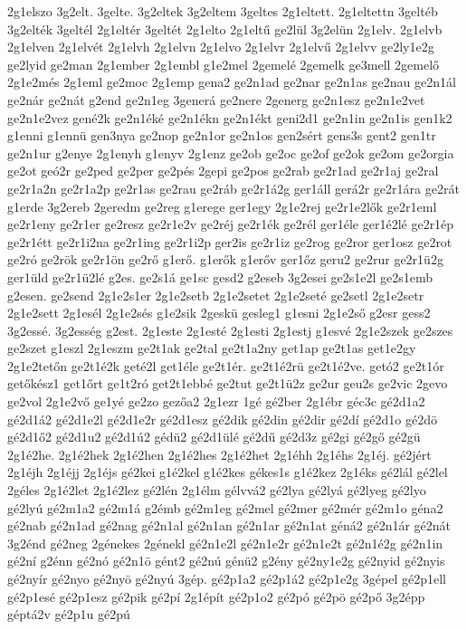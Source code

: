 {2g1elszo
3g2elt.
3gelte.
3g2eltek
3g2eltem
3geltes
2g1eltett.
2g1eltettn
3geltéb
3g2elték
3geltél
2g1eltér
3geltét
2g1elto
2g1eltű
ge2lül
3g2elün
2g1elv.
2g1elvb
2g1elven
2g1elvét
2g1elvh
2g1elvn
2g1elvo
2g1elvr
2g1elvű
2g1elvv
ge2ly1e2g
ge2lyid
ge2man
2g1ember
2g1embl
g1e2mel
2gemelé
2gemelk
ge3mell
2gemelő
2g1e2més
2g1eml
ge2moc
2g1emp
gena2
ge2n1ad
ge2nar
ge2n1as
ge2nau
ge2n1ál
ge2nár
ge2nát
g2end
ge2n1eg
3generá
ge2nere
2generg
ge2n1esz
ge2n1e2vet
ge2n1e2vez
gené2k
ge2n1éké
ge2n1ékn
ge2n1ékt
geni2d1
ge2n1in
ge2n1is
gen1k2
g1enni
g1ennü
gen3nya
ge2nop
ge2n1or
ge2n1os
gen2sért
gens3s
gent2
gen1tr
ge2n1ur
g2enye
2g1enyh
g1enyv
2g1enz
ge2ob
ge2oc
ge2of
ge2ok
ge2om
ge2orgia
ge2ot
geó2r
ge2ped
ge2per
ge2pés
2gepi
ge2pos
ge2rab
ge2r1ad
ge2r1aj
ge2ral
ge2r1a2n
ge2r1a2p
ge2r1as
ge2rau
ge2ráb
ge2r1á2g
ger1áll
gerá2r
ge2r1ára
ge2rát
g1erde
3g2ereb
2geredm
ge2reg
g1erege
ger1egy
2g1e2rej
ge2r1e2lők
ge2r1eml
ge2r1eny
ge2r1er
ge2resz
ge2r1e2v
ge2réj
ge2r1ék
ge2rél
ger1éle
ger1é2lé
ge2r1ép
ge2r1étt
ge2r1i2na
ge2r1ing
ge2r1i2p
ger2is
ge2r1iz
ge2rog
ge2ror
ger1osz
ge2rot
ge2ró
ge2rök
ge2r1ön
ge2rő
g1erő.
g1erők
g1erőv
ger1őz
geru2
ge2rur
ge2r1ü2g
ger1üld
ge2r1ü2lé
g2es.
ge2s1á
ge1sc
gesd2
g2eseb
3g2esei
ge2s1e2l
ge2s1emb
g2esen.
ge2send
2g1e2s1er
2g1e2setb
2g1e2setet
2g1e2seté
ge2setl
2g1e2setr
2g1e2sett
2g1esél
2g1e2sés
g1e2sik
2geskü
gesleg1
g1esni
2g1e2ső
g2esr
gess2
3g2essé.
3g2esség
g2est.
2g1este
2g1esté
2g1esti
2g1estj
g1esvé
2g1e2szek
ge2szes
ge2szet
g1eszl
2g1eszm
ge2t1ak
ge2tal
ge2t1a2ny
get1ap
ge2t1as
get1e2gy
2g1e2tetőn
ge2t1é2k
geté2l
get1éle
ge2t1ér.
ge2t1é2rü
ge2t1é2ve.
getó2
ge2t1ór
getőkész1
get1őrt
ge1t2ró
get2t1ebbé
ge2tut
ge2t1ü2z
ge2ur
geu2s
ge2vic
2gevo
ge2vol
2g1e2vő
ge1yé
ge2zo
gezőa2
2g1ezr
1gé
gé2ber
2g1ébr
géc3c
gé2d1a2
gé2d1á2
gé2d1e2l
gé2d1e2r
gé2d1esz
gé2dik
gé2din
gé2dir
gé2dí
gé2d1o
gé2dö
gé2d1ő2
gé2d1u2
gé2d1ú2
gédü2
gé2d1ülé
gé2dű
gé2d3z
gé2gi
gé2gő
gé2gü
2g1é2he.
2g1é2hek
2g1é2hen
2g1é2hes
2g1é2het
2g1éhh
2g1éhs
2g1éj.
gé2jért
2g1éjh
2g1éjj
2g1éjs
gé2kei
g1é2kel
g1é2kes
gékes1s
g1é2kez
2g1éks
gé2lál
gé2lel
2géles
2g1é2let
2g1é2lez
gé2lén
2g1élm
gélvvá2
gé2lya
gé2lyá
gé2lyeg
gé2lyo
gé2lyú
gé2m1a2
gé2m1á
g2émb
gé2m1eg
gé2mel
gé2mer
gé2mér
gé2m1o
géna2
gé2nab
gé2n1ad
gé2nag
gé2n1al
gé2n1an
gé2n1ar
gé2n1at
géná2
gé2n1ár
gé2nát
3g2énd
gé2neg
2génekes
2génekl
gé2n1e2l
gé2n1e2r
gé2n1e2t
gé2n1é2g
gé2n1in
gé2ní
g2énn
gé2nó
gé2n1ö
gént2
gé2nú
génü2
g2ény
gé2ny1e2g
gé2nyid
gé2nyis
gé2nyír
gé2nyo
gé2nyö
gé2nyú
3gép.
gé2p1a2
gé2p1á2
gé2p1e2g
3gépel
gé2p1ell
gé2p1esé
gé2p1esz
gé2pik
gé2pí
2g1épít
gé2p1o2
gé2pó
gé2pö
gé2pő
3g2épp
géptá2v
gé2p1u
gé2pú
}
